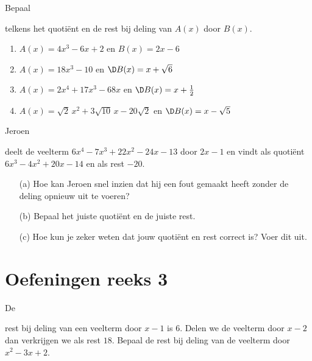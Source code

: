 \documentclass{ximera}
\begin{document}
\begin{Oefening}\setcounter{enumi}{14}  
\hypertarget{oef3.14}{Bepaal} telkens het quoti\"ent en de rest bij deling van $A(x)$ door $B(x)$.
\begin{enumerate}

\item
$A(x) = 4x^3-6x+2$ \quad en \quad $B(x) = 2x-6$
\item
$A(x) = 18x^3-10$ \quad en \quad $\D B(x) = x + \sqrt{6}$
\item 
$A(x) = 2x^4 + 17x^3 - 68x$ \quad en \quad $\D B(x) = x+\frac{1}{2}$
\item 
$A(x) = \sqrt{2}\,x^2 + 3\sqrt{10}\,x - 20\sqrt{2}$ \quad en \quad $\D B(x) = x - \sqrt{5}$
\end{enumerate}
\end{Oefening}

\begin{Oefening}\setcounter{enumi}{15}  
\hypertarget{oef3.15}{Jeroen} deelt de veelterm $6x^4-7x^3+22x^2-24x-13$ door $2x-1$ en vindt als quoti\"ent $6x^3-4x^2+20x-14$ en als rest $-20$. 
\begin{enumerate}
\item[(a)]
Hoe kan Jeroen snel inzien dat hij een fout gemaakt heeft zonder de deling opnieuw uit te voeren? 
\item[(b)]
Bepaal het juiste quoti\"ent en de juiste rest.
\item[(c)]
Hoe kun je zeker weten dat jouw quoti\"ent en rest correct is? Voer dit uit.
\end{enumerate}
\end{Oefening}

\section*{Oefeningen reeks 3}

\begin{Oefening}\setcounter{enumi}{16}   
\hypertarget{oef3.16}{De} rest bij deling van een veelterm door $x-1$ is $6$. Delen we de veelterm door $x-2$ dan verkrijgen we als rest $18$. Bepaal de rest bij deling van de veelterm door $x^2-3x+2$. %
\end{Oefening}
\end{document}
